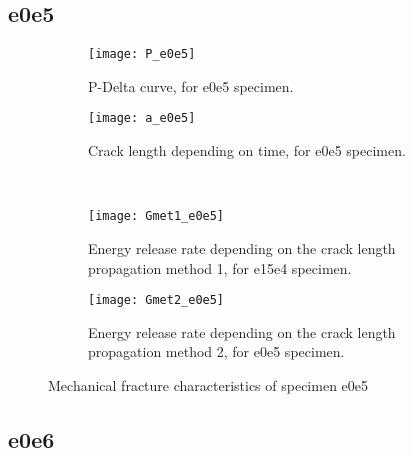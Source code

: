 \subsection{e0e5}

\begin{figure}[H]
	\centering
	\begin{subfigure}{0.48\linewidth}
		\centering
		\texttt{[image: P\_e0e5]}
		\decoRule
		\caption{P-Delta curve, for e0e5 specimen.}
		\label{fig:P_e0e5}
	\end{subfigure}
	\hfill 
	\begin{subfigure}{0.48\linewidth}
		\centering
		\texttt{[image: a\_e0e5]}
		\decoRule
		\caption{Crack length depending on time, for e0e5 specimen.}
		\label{fig:a_e0e5}
	\end{subfigure}
	\hfill\\
	\begin{subfigure}{0.48\linewidth}
		\centering
		\texttt{[image: Gmet1\_e0e5]}
		\decoRule
		\caption{Energy release rate depending on the crack length propagation method 1, for e15e4 specimen.}
		\label{fig:Gmet1_e0e5}
	\end{subfigure}
	\hfill
	\begin{subfigure}{0.48\linewidth}
		\centering
		\texttt{[image: Gmet2\_e0e5]}
		\decoRule
		\caption{Energy release rate depending on the crack length propagation method 2, for e0e5 specimen.}
		\label{fig:Gmet2_e0e5}
	\end{subfigure}
	\caption{Mechanical fracture characteristics of specimen e0e5}
	\label{e0e5}
\end{figure}

\subsection{e0e6}

